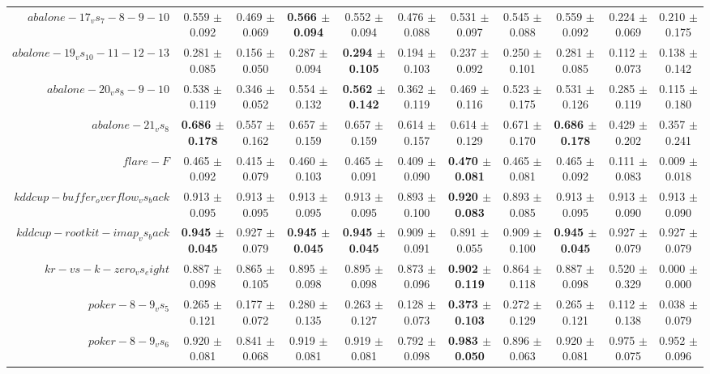 \begin{table}[!ht]
{\begin{tabular}{r c c c c c c c c c c}
$abalone-17_vs_7-8-9-10$ & 0.559 $\pm$ 0.092 & 0.469 $\pm$ 0.069 & \textbf{0.566 $\pm$ 0.094} & 0.552 $\pm$ 0.094 & 0.476 $\pm$ 0.088 & 0.531 $\pm$ 0.097 & 0.545 $\pm$ 0.088 & 0.559 $\pm$ 0.092 & 0.224 $\pm$ 0.069 & 0.210 $\pm$ 0.175 \\
$abalone-19_vs_10-11-12-13$ & 0.281 $\pm$ 0.085 & 0.156 $\pm$ 0.050 & 0.287 $\pm$ 0.094 & \textbf{0.294 $\pm$ 0.105} & 0.194 $\pm$ 0.103 & 0.237 $\pm$ 0.092 & 0.250 $\pm$ 0.101 & 0.281 $\pm$ 0.085 & 0.112 $\pm$ 0.073 & 0.138 $\pm$ 0.142 \\
$abalone-20_vs_8-9-10$ & 0.538 $\pm$ 0.119 & 0.346 $\pm$ 0.052 & 0.554 $\pm$ 0.132 & \textbf{0.562 $\pm$ 0.142} & 0.362 $\pm$ 0.119 & 0.469 $\pm$ 0.116 & 0.523 $\pm$ 0.175 & 0.531 $\pm$ 0.126 & 0.285 $\pm$ 0.119 & 0.115 $\pm$ 0.180 \\
$abalone-21_vs_8$ & \textbf{0.686 $\pm$ 0.178} & 0.557 $\pm$ 0.162 & 0.657 $\pm$ 0.159 & 0.657 $\pm$ 0.159 & 0.614 $\pm$ 0.157 & 0.614 $\pm$ 0.129 & 0.671 $\pm$ 0.170 & \textbf{0.686 $\pm$ 0.178} & 0.429 $\pm$ 0.202 & 0.357 $\pm$ 0.241 \\
$flare-F$ & 0.465 $\pm$ 0.092 & 0.415 $\pm$ 0.079 & 0.460 $\pm$ 0.103 & 0.465 $\pm$ 0.091 & 0.409 $\pm$ 0.090 & \textbf{0.470 $\pm$ 0.081} & 0.465 $\pm$ 0.081 & 0.465 $\pm$ 0.092 & 0.111 $\pm$ 0.083 & 0.009 $\pm$ 0.018 \\
$kddcup-buffer_overflow_vs_back$ & 0.913 $\pm$ 0.095 & 0.913 $\pm$ 0.095 & 0.913 $\pm$ 0.095 & 0.913 $\pm$ 0.095 & 0.893 $\pm$ 0.100 & \textbf{0.920 $\pm$ 0.083} & 0.893 $\pm$ 0.085 & 0.913 $\pm$ 0.095 & 0.913 $\pm$ 0.090 & 0.913 $\pm$ 0.090 \\
$kddcup-rootkit-imap_vs_back$ & \textbf{0.945 $\pm$ 0.045} & 0.927 $\pm$ 0.079 & \textbf{0.945 $\pm$ 0.045} & \textbf{0.945 $\pm$ 0.045} & 0.909 $\pm$ 0.091 & 0.891 $\pm$ 0.055 & 0.909 $\pm$ 0.100 & \textbf{0.945 $\pm$ 0.045} & 0.927 $\pm$ 0.079 & 0.927 $\pm$ 0.079 \\
$kr-vs-k-zero_vs_eight$ & 0.887 $\pm$ 0.098 & 0.865 $\pm$ 0.105 & 0.895 $\pm$ 0.098 & 0.895 $\pm$ 0.098 & 0.873 $\pm$ 0.096 & \textbf{0.902 $\pm$ 0.119} & 0.864 $\pm$ 0.118 & 0.887 $\pm$ 0.098 & 0.520 $\pm$ 0.329 & 0.000 $\pm$ 0.000 \\
$poker-8-9_vs_5$ & 0.265 $\pm$ 0.121 & 0.177 $\pm$ 0.072 & 0.280 $\pm$ 0.135 & 0.263 $\pm$ 0.127 & 0.128 $\pm$ 0.073 & \textbf{0.373 $\pm$ 0.103} & 0.272 $\pm$ 0.129 & 0.265 $\pm$ 0.121 & 0.112 $\pm$ 0.138 & 0.038 $\pm$ 0.079 \\
$poker-8-9_vs_6$ & 0.920 $\pm$ 0.081 & 0.841 $\pm$ 0.068 & 0.919 $\pm$ 0.081 & 0.919 $\pm$ 0.081 & 0.792 $\pm$ 0.098 & \textbf{0.983 $\pm$ 0.050} & 0.896 $\pm$ 0.063 & 0.920 $\pm$ 0.081 & 0.975 $\pm$ 0.075 & 0.952 $\pm$ 0.096 \\

\end{tabular}}
\end{table}
